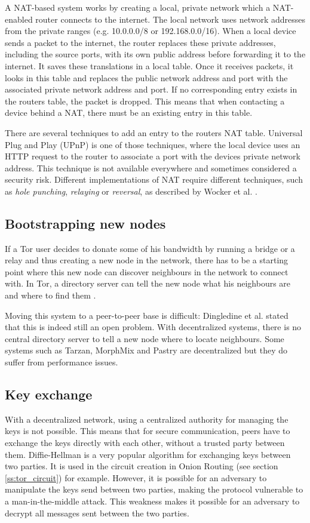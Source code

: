 \documentclass{article}
\begin{document}
		A NAT-based system works by creating a local, private network which a NAT-enabled router connects to the internet. The local network uses network addresses from the private ranges (e.g. 10.0.0.0/8 or 192.168.0.0/16). When a local device sends a packet to the internet, the router replaces these private addresses, including the source ports, with its own public address before forwarding it to the internet. It saves these translations in a local table. Once it receives packets, it looks in this table and replaces the public network address and port with the associated private network address and port. If no corresponding entry exists in the routers table, the packet is dropped. This means that when contacting a device behind a NAT, there must be an existing entry in this table.
		
		There are several techniques to add an entry to the routers NAT table. Universal Plug and Play (UPnP) is one of those techniques, where the local device uses an HTTP request to the router to associate a port with the devices private network address. This technique is not available everywhere and sometimes considered a security risk. Different implementations of NAT require different techniques, such as \textit{hole punching}, \textit{relaying} or \textit{reversal}, as described by Wocker et al. \cite{wacker2008nat}.

	\subsection{Bootstrapping new nodes}
		If a Tor user decides to donate some of his bandwidth by running a bridge or a relay and thus creating a new node in the network, there has to be a starting point where this new node can discover neighbours in the network to connect with. In Tor, a directory server can tell the new node what his neighbours are and where to find them \cite{dingledine2004tor}.
		
		Moving this system to a peer-to-peer base is difficult: Dingledine et al. stated that this is indeed still an open problem. With decentralized systems, there is no central directory server to tell a new node where to locate neighbours. Some systems such as Tarzan, MorphMix and Pastry \cite{rowstron2001pastry, rennhard2002introducing} are decentralized but they do suffer from performance issues.

	\subsection{Key exchange}
		With a decentralized network, using a centralized authority for managing the keys is not possible. This means that for secure communication, peers have to exchange the keys directly with each other, without a trusted party between them. Diffie-Hellman is a very popular algorithm for exchanging keys between two parties. It is used in the circuit creation in Onion Routing (see section \ref{ss:tor_circuit}) for example. However, it is possible for an adversary to manipulate the keys send between two parties, making the protocol vulnerable to a man-in-the-middle attack. This weakness makes it possible for an adversary to decrypt all messages sent between the two parties.
\end{document}
